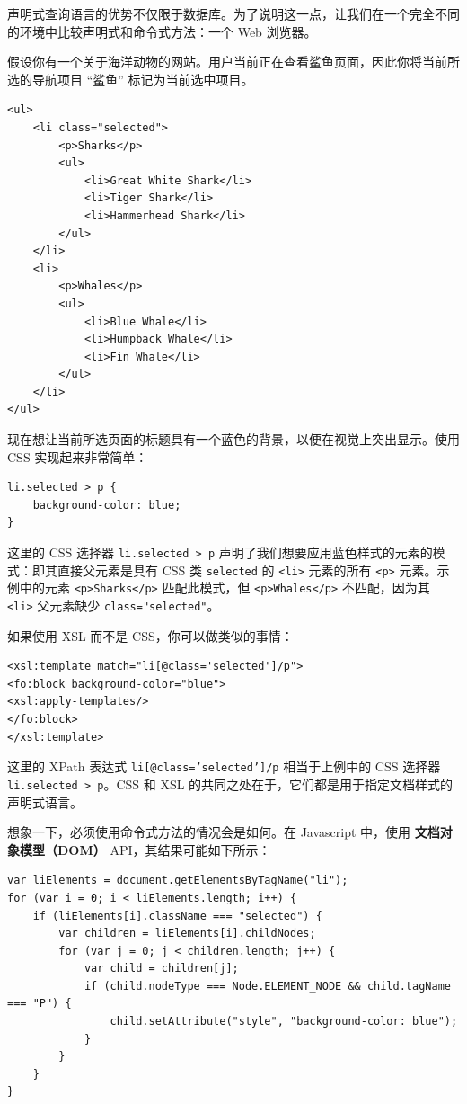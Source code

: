 声明式查询语言的优势不仅限于数据库。为了说明这一点，让我们在一个完全不同的环境中比较声明式和命令式方法：一个 Web 浏览器。

假设你有一个关于海洋动物的网站。用户当前正在查看鲨鱼页面，因此你将当前所选的导航项目 “鲨鱼” 标记为当前选中项目。

\begin{lstlisting}
<ul>
    <li class="selected">
        <p>Sharks</p>
        <ul>
            <li>Great White Shark</li>
            <li>Tiger Shark</li>
            <li>Hammerhead Shark</li>
        </ul>
    </li>
    <li>
        <p>Whales</p>
        <ul>
            <li>Blue Whale</li>
            <li>Humpback Whale</li>
            <li>Fin Whale</li>
        </ul>
    </li>
</ul>
\end{lstlisting}

现在想让当前所选页面的标题具有一个蓝色的背景，以便在视觉上突出显示。使用 CSS 实现起来非常简单：

\begin{lstlisting}
li.selected > p {
    background-color: blue;
}   
\end{lstlisting}

这里的 CSS 选择器 \texttt{li.selected > p} 声明了我们想要应用蓝色样式的元素的模式：即其直接父元素是具有 CSS 类 \texttt{selected} 的 \texttt{<li>} 元素的所有 \texttt{<p>} 元素。示例中的元素 \texttt{<p>Sharks</p>} 匹配此模式，但 \texttt{<p>Whales</p>} 不匹配，因为其 \texttt{<li>} 父元素缺少 \texttt{class="selected"}。

如果使用 XSL 而不是 CSS，你可以做类似的事情：

\begin{lstlisting}
<xsl:template match="li[@class='selected']/p">
<fo:block background-color="blue">
<xsl:apply-templates/>
</fo:block>
</xsl:template>
\end{lstlisting}

这里的 XPath 表达式 \texttt{li[@class='selected']/p} 相当于上例中的 CSS 选择器 \texttt{li.selected > p}。CSS 和 XSL 的共同之处在于，它们都是用于指定文档样式的声明式语言。

想象一下，必须使用命令式方法的情况会是如何。在 Javascript 中，使用 \textbf{文档对象模型（DOM）} API，其结果可能如下所示：

\begin{lstlisting}
var liElements = document.getElementsByTagName("li");
for (var i = 0; i < liElements.length; i++) {
    if (liElements[i].className === "selected") {
        var children = liElements[i].childNodes;
        for (var j = 0; j < children.length; j++) {
            var child = children[j];
            if (child.nodeType === Node.ELEMENT_NODE && child.tagName === "P") {
                child.setAttribute("style", "background-color: blue");
            }
        }
    }
}
\end{lstlisting}


